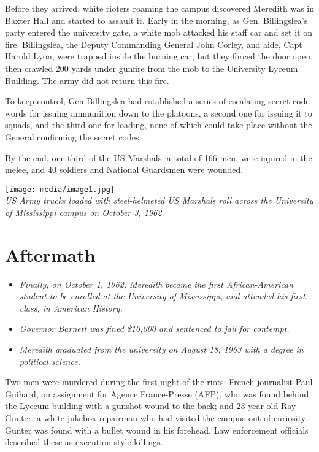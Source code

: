 Before they arrived, white rioters roaming the campus discovered
Meredith was in Baxter Hall and started to assault it. Early in the
morning, as Gen. Billingslea's party entered the university gate, a
white mob attacked his staff car and set it on fire. Billingslea, the
Deputy Commanding General John Corley, and aide, Capt Harold Lyon, were
trapped inside the burning car, but they forced the door open, then
crawled 200 yards under gunfire from the mob to the University Lyceum
Building. The army did not return this fire.

To keep control, Gen Billingslea had established a series of escalating
secret code words for issuing ammunition down to the platoons, a second
one for issuing it to squads, and the third one for loading, none of
which could take place without the General confirming the secret codes.

By the end, one-third of the US Marshals, a total of 166 men, were
injured in the melee, and 40 soldiers and National Guardsmen were
wounded.

\texttt{[image: media/image1.jpg]}\\
\emph{US Army trucks loaded with steel-helmeted US Marshals roll across
the University of Mississippi campus on October 3, 1962.}

\section{Aftermath}\label{aftermath}

\begin{itemize}
\item
  \emph{Finally, on October 1, 1962, Meredith became the first
  African-American student to be enrolled at the University of
  Mississippi, and attended his first class, in American History.}
\item
  \emph{Governor Barnett was fined \$10,000 and sentenced to jail for
  contempt.}
\item
  \emph{Meredith graduated from the university on August 18, 1963 with a
  degree in political science.}
\end{itemize}

Two men were murdered during the first night of the riots: French
journalist Paul Guihard, on assignment for Agence France-Presse (AFP),
who was found behind the Lyceum building with a gunshot wound to the
back; and 23-year-old Ray Gunter, a white jukebox repairman who had
visited the campus out of curiosity. Gunter was found with a bullet
wound in his forehead. Law enforcement officials described these as
execution-style killings.

